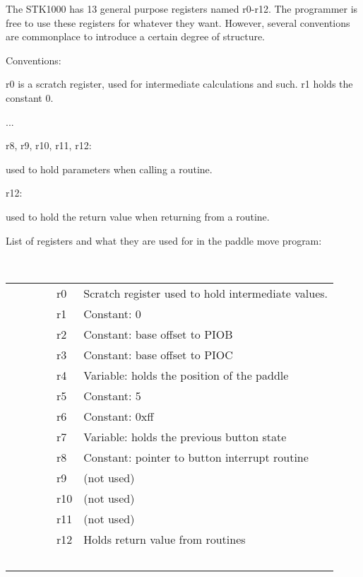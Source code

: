 The STK1000 has 13 general purpose registers named r0-r12. The programmer is free to use these registers for whatever they want.
However, several conventions are commonplace to introduce a certain degree of structure.

Conventions:

r0 is a scratch register, used for intermediate calculations and such.
r1 holds the constant 0.

...

r8, r9, r10, r11, r12:

used to hold parameters when calling a routine.

r12:

used to hold the return value when returning from a routine.


List of registers and what they are used for in the paddle move program:

\begin{center}
\begin{table}
    \begin{tabular}{|l|l|}
        r0  & Scratch register used to hold intermediate values. \\
        r1  & Constant: 0 \\ 
        r2  & Constant: base offset to PIOB \\ 
        r3  & Constant: base offset to PIOC \\ 
        r4  & Variable: holds the position of the paddle \\ 
        r5  & Constant: 5 \\ 
        r6  & Constant: 0xff \\ 
        r7  & Variable: holds the previous button state \\ 
        r8  & Constant: pointer to button interrupt routine \\ 
        r9  & (not used) \\ 
        r10 & (not used) \\ 
        r11 & (not used) \\ 
        r12 & Holds return value from routines \\
    \end{tabular}
\label{tab:label}
\end{table}
\end{center}
